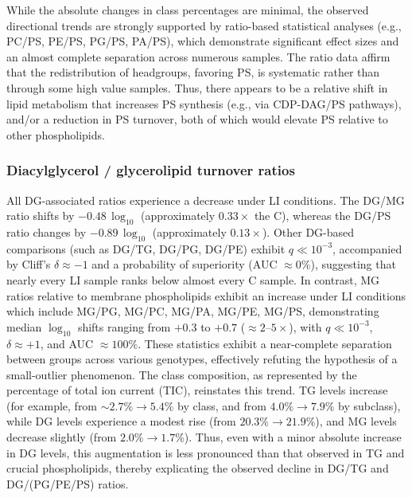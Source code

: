 \documentclass[10pt,letterpaper]{article}
\begin{document}
\begin{itemize}
While the absolute changes in class percentages are minimal, the observed directional trends are strongly supported by ratio-based statistical analyses (e.g., PC/PS, PE/PS, PG/PS, PA/PS), which demonstrate significant effect sizes and an almost complete separation across numerous samples. The ratio data affirm that the redistribution of headgroups, favoring PS, is systematic rather than through some high value samples. Thus, there appears to be a relative shift in lipid metabolism that increases PS synthesis (e.g., via CDP-DAG/PS pathways), and/or a reduction in PS turnover, both of which would elevate PS relative to other phospholipids. 



\subsubsection*{Diacylglycerol / glycerolipid turnover ratios}
All DG-associated ratios experience a decrease under LI conditions. The DG/MG ratio shifts by $-0.48 \,\log_{10}$ (approximately $0.33\times$ the C), whereas the DG/PS ratio changes by $-0.89 \,\log_{10}$ (approximately $0.13\times$). Other DG-based comparisons (such as DG/TG, DG/PG, DG/PE) exhibit $q \ll 10^{-3}$, accompanied by Cliff’s $\delta \approx -1$ and a probability of superiority (AUC $\approx 0\%$), suggesting that nearly every LI sample ranks below almost every C sample. In contrast, MG ratios relative to membrane phospholipids exhibit an increase under LI conditions which include MG/PG, MG/PC, MG/PA, MG/PE, MG/PS, demonstrating median $\log_{10}$ shifts ranging from $+0.3$ to $+0.7$ ($\approx 2$–$5\times$), with $q \ll 10^{-3}$, $\delta \approx +1$, and AUC $\approx 100\%$. These statistics exhibit a near-complete separation between groups across various genotypes, effectively refuting the hypothesis of a small-outlier phenomenon. The class composition, as represented by the percentage of total ion current (TIC), reinstates this trend. TG levels increase (for example, from $\sim 2.7\% \rightarrow 5.4\%$ by class, and from $4.0\% \rightarrow 7.9\%$ by subclass), while DG levels experience a modest rise (from $20.3\% \rightarrow 21.9\%$), and MG levels decrease slightly (from $2.0\% \rightarrow 1.7\%$). Thus, even with a minor absolute increase in DG levels, this augmentation is less pronounced than that observed in TG and crucial phospholipids, thereby explicating the observed decline in DG/TG and DG/(PG/PE/PS) ratios. 



\end{itemize}
\end{document}
